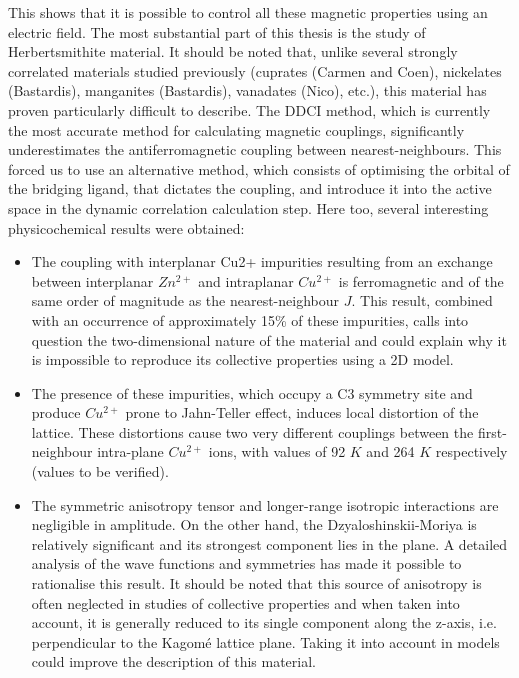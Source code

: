 \documentclass[12pt]{report}
\numberwithin{equation}{section}
\begin{document}
This shows that it is possible to control all these magnetic properties using an electric field.  
The most substantial part of this thesis is the study of Herbertsmithite material. 
It should be noted that, unlike several strongly correlated materials studied previously (cuprates (Carmen and Coen), nickelates (Bastardis), manganites (Bastardis), vanadates (Nico), etc.), this material has proven particularly difficult to describe.
The DDCI method, which is currently the most accurate method for calculating magnetic couplings, significantly underestimates the antiferromagnetic coupling between nearest-neighbours.
This forced us to use an alternative method, which consists of optimising the orbital of the bridging ligand, that dictates the coupling, and introduce it into the active space in the dynamic correlation calculation step.
Here too, several interesting physicochemical results were obtained:
\begin{itemize}
    \item[-]The coupling with interplanar Cu2+ impurities resulting from an exchange between interplanar $Zn^{2+}$ and intraplanar $Cu^{2+}$ is ferromagnetic and of the same order of magnitude as the nearest-neighbour $J$. 
    This result, combined with an occurrence of approximately 15\% of these impurities, calls into question the two-dimensional nature of the material and could explain why it is impossible to reproduce its collective properties using a 2D model.
    \item[-]The presence of these impurities, which occupy a C3 symmetry site and produce $Cu^{2+}$ prone to Jahn-Teller effect, induces local distortion of the lattice.
    These distortions cause two very different couplings between the first-neighbour intra-plane $Cu^{2+}$ ions, with values of 92 $K$ and 264 $K$ respectively (values to be verified).
    \item[-]The symmetric anisotropy tensor and longer-range isotropic interactions are negligible in amplitude.
    On the other hand, the Dzyaloshinskii-Moriya is relatively significant and its strongest component lies in the plane.
    A detailed analysis of the wave functions and symmetries has made it possible to rationalise this result.
    It should be noted that this source of anisotropy is often neglected in studies of collective properties and when taken into account, it is generally reduced to its single component along the z-axis, i.e. perpendicular to the Kagomé lattice plane.
    Taking it into account in models could improve the description of this material. 
\end{itemize}
\end{document}
